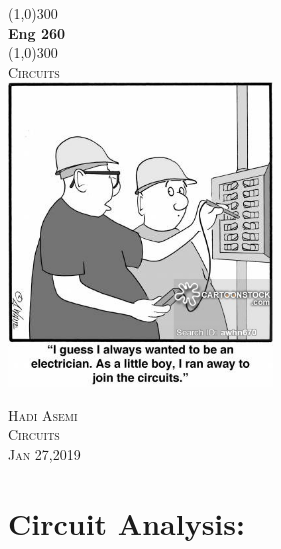 \documentclass[a4paper,12]{article}
\begin{document}
\begin{titlepage}
	\begin{center}
		\line(1,0){300}\\
		[0.25in]
		\huge{\bfseries Eng 260}\\
		[2mm]
		\line(1,0){300}\\
		[1.5cm]
		\textsc{\LARGE Circuits}\\
		[5cm]
		\includegraphics[width=70mm]{Image/7.jpg}
		\textsc{\Large }\\
		[4cm]
		
	\end{center}
	\begin{flushright}
		\textsc{\large Hadi Asemi\\
		Circuits\\
		Jan 27,2019\\}
	\end{flushright}
\end{titlepage}
	
\cleardoublepage
\tableofcontents
\thispagestyle{empty}
\cleardoublepage
\setcounter{page}{1}
\section{Circuit Analysis:}
\end{document}
